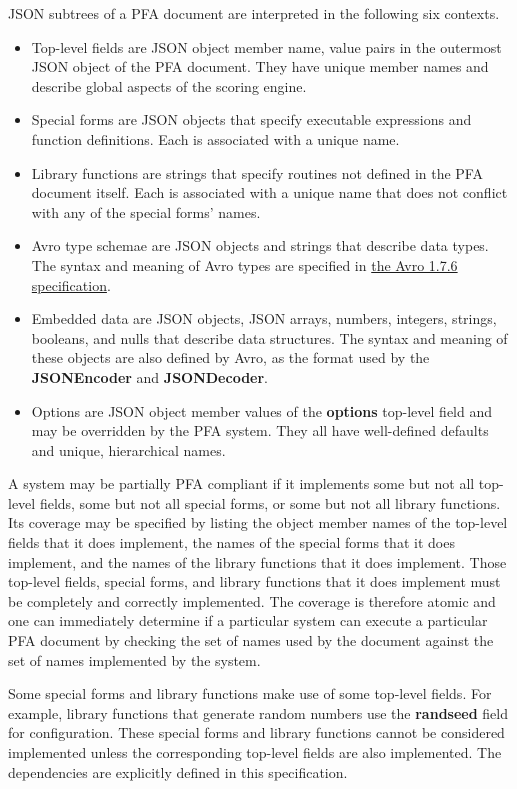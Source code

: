 \documentclass{article}
\newcommand{\PFAc}{\ttfamily\bfseries}
\theoremstyle{definition}
\begin{document}
JSON subtrees of a PFA document are interpreted in the following six contexts.
\begin{itemize}
\item Top-level fields are JSON object member name, value pairs in the outermost JSON object of the PFA document.  They have unique member names and describe global aspects of the scoring engine.
\item Special forms are JSON objects that specify executable expressions and function definitions.  Each is associated with a unique name.
\item Library functions are strings that specify routines not defined in the PFA document itself.  Each is associated with a unique name that does not conflict with any of the special forms' names.
\item Avro type schemae are JSON objects and strings that describe data types.  The syntax and meaning of Avro types are specified in \href{http://avro.apache.org/docs/1.7.6/spec.html}{the Avro 1.7.6 specification}.
\item Embedded data are JSON objects, JSON arrays, numbers, integers, strings, booleans, and nulls that describe data structures.  The syntax and meaning of these objects are also defined by Avro, as the format used by the {\PFAc JSONEncoder} and {\PFAc JSONDecoder}.
\item Options are JSON object member values of the {\PFAc options} top-level field and may be overridden by the PFA system.  They all have well-defined defaults and unique, hierarchical names.
\end{itemize}

A system may be partially PFA compliant if it implements some but not all top-level fields, some but not all special forms, or some but not all library functions.  Its coverage may be specified by listing the object member names of the top-level fields that it does implement, the names of the special forms that it does implement, and the names of the library functions that it does implement.  Those top-level fields, special forms, and library functions that it does implement must be completely and correctly implemented.  The coverage is therefore atomic and one can immediately determine if a particular system can execute a particular PFA document by checking the set of names used by the document against the set of names implemented by the system.

Some special forms and library functions make use of some top-level fields.  For example, library functions that generate random numbers use the {\PFAc randseed} field for configuration.  These special forms and library functions cannot be considered implemented unless the corresponding top-level fields are also implemented.  The dependencies are explicitly defined in this specification.
\end{document}
